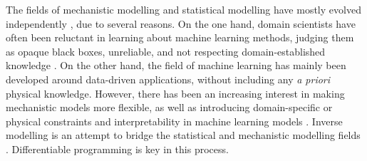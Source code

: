 
The fields of mechanistic modelling and statistical modelling have mostly evolved independently \cite{zdeborova_understanding_2020}, due to several reasons. 
On the one hand, domain scientists have often been reluctant in learning about machine learning methods, judging them as opaque black boxes, unreliable, and not respecting domain-established knowledge \cite{Coveney:2016eb}. 
On the other hand, the field of machine learning has mainly been developed around data-driven applications, without including any \textit{a priori} physical knowledge. 
However, there has been an increasing interest in making mechanistic models more flexible, as well as introducing domain-specific or physical constraints and interpretability in machine learning models \cite{Molnar.2020sisk,Rudin.2022,Schneider2017,rasp2018,Yazdani2020,Abarbanel2018,Carrassi2018,Bocquet2019,Gabor2015,Gharamti2017,Curtsdotter2019,Rosenbaum2019,Toms2020,Brajard2021}.
Inverse modelling is an attempt to bridge the statistical and mechanistic modelling fields \cite{Wigner.1960, Rude:2018jv}. 
Differentiable programming is key in this process.


